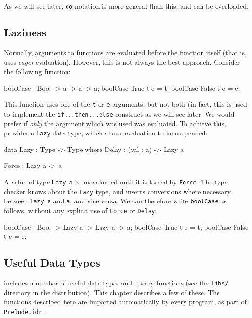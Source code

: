 \noindent
As we will see later, \texttt{do} notation is more general than this, and can be overloaded.

\subsection{Laziness}

\label{sect:lazy}
Normally, arguments to functions are evaluated before the function itself
(that is, \Idris{} uses \emph{eager} evaluation). However, this is not always
the best approach. Consider the following function:

\begin{code}
boolCase : Bool -> a -> a -> a;
boolCase True  t e = t;
boolCase False t e = e;
\end{code}

\noindent
This function uses one of the \texttt{t} or \texttt{e} arguments, but not both (in fact, this is used to implement the \texttt{if...then...else} construct as we will see later.
We would prefer if \emph{only} the argument which was used was evaluated.
To achieve this, \Idris{} provides a \texttt{Lazy} data type, which allows evaluation to be suspended:

\begin{code}
data Lazy : Type -> Type where
     Delay : (val : a) -> Lazy a

Force : Lazy a -> a
\end{code}

\noindent
A value of type \texttt{Lazy a} is unevaluated until it is forced by \texttt{Force}.
The \Idris{} type checker knows about the \texttt{Lazy} type, and inserts conversions where necessary between \texttt{Lazy a} and \texttt{a}, and vice versa.
We can therefore write \texttt{boolCase} as follows, without any explicit
use of \texttt{Force} or \texttt{Delay}:

\begin{code}
boolCase : Bool -> Lazy a -> Lazy a -> a;
boolCase True  t e = t;
boolCase False t e = e;
\end{code}


\subsection{Useful Data Types}

\Idris{} includes a number of useful data types and library functions (see the \texttt{libs/} directory in the distribution).
This chapter describes a few of these.
The functions described here are imported automatically by every \Idris{} program, as part of \texttt{Prelude.idr}.

